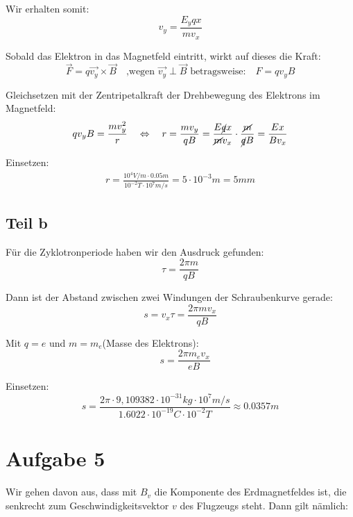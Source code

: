\documentclass[a4paper,german,12pt,smallheadings]{scrartcl}
\begin{document}
Wir erhalten somit:
\begin{equation*}
v_y=\frac{E_yqx}{mv_x}
\end{equation*}

Sobald das Elektron in das Magnetfeld eintritt, wirkt auf dieses die Kraft:
\begin{equation*}
\vec{F}=q\vec{v_y} \times \vec{B} \quad \text{,wegen $\vec{v_y} \perp \vec{B}$ betragsweise:} \quad F=qv_yB
\end{equation*}

Gleichsetzen mit der Zentripetalkraft der Drehbewegung des Elektrons im Magnetfeld:
\begin{equation*}
qv_yB=\frac{mv_y^2}{r} \quad \Leftrightarrow \quad r=\frac{m v_y}{qB}=\frac{E\cancel{q}x}{\cancel{m}v_x} \cdot \frac{\cancel{m}}{\cancel{q}B}=\frac{Ex}{Bv_x}
\end{equation*}

Einsetzen:
\begin{align*}
r=\frac{10^4V/m \cdot 0.05m}{10^{-2}T \cdot 10^7m/s} = 5 \cdot 10^{-3}m=5mm
\end{align*}

\subsection*{Teil b}
Für die Zyklotronperiode haben wir den Ausdruck gefunden:
\begin{equation*}
\tau=\frac{2\pi m}{qB}
\end{equation*}

Dann ist der Abstand zwischen zwei Windungen der Schraubenkurve gerade:
\begin{equation*}
s=v_x\tau = \frac{2 \pi m v_x}{qB}
\end{equation*}

Mit $q=e$ und $m=m_e$(Masse des Elektrons):
\begin{equation*}
\quad s=\frac{2 \pi m_e v_x}{eB}
\end{equation*}

Einsetzen:
\begin{equation*}
s=\frac{2\pi \cdot 9,109 382\cdot 10^{-31}kg \cdot 10^7 m/s}{1.6022 \cdot 10^{-19}C \cdot 10^{-2}T} \approx 0.0357m
\end{equation*}

\section*{Aufgabe 5}
Wir gehen davon aus, dass mit $B_v$ die Komponente des Erdmagnetfeldes ist, die
senkrecht zum Geschwindigkeitsvektor $v$ des Flugzeugs steht. Dann gilt
nämlich:
\end{document}
